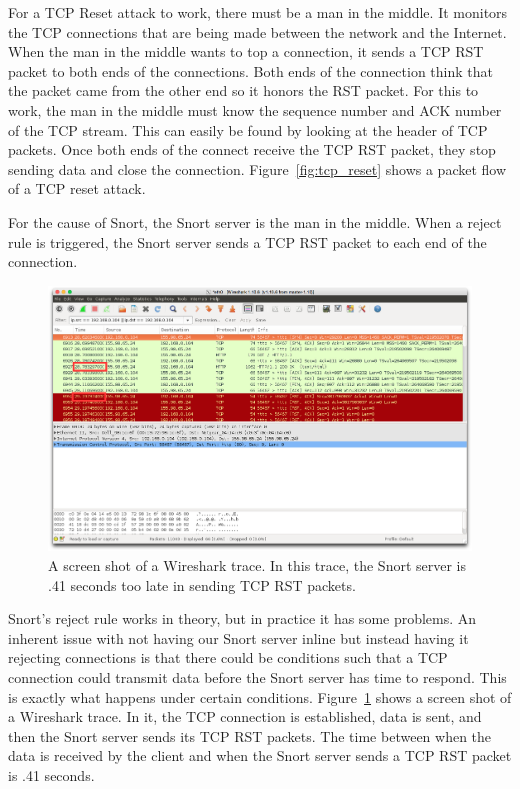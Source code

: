 For a TCP Reset attack to work, there must be a man in the middle. It monitors
the TCP connections that are being made between the network and the Internet.
When the man in the middle wants to top a connection, it sends a TCP RST packet
to both ends of the connections. Both ends of the connection think that the
packet came from the other end so it honors the RST packet. For this to work,
the man in the middle must know the sequence number and ACK number of the TCP
stream. This can easily be found by looking at the header of TCP packets. Once
both ends of the connect receive the TCP RST packet, they stop sending data and
close the connection. Figure~\ref{fig:tcp_reset} shows a packet flow of a TCP
reset attack.

For the cause of Snort, the Snort server is the man in the middle. When a
reject rule is triggered, the Snort server sends a TCP RST packet to each end
of the connection.

\begin{figure}[!t]
    \centering
    \includegraphics[width=\columnwidth]{figures/snort_slow}
    \caption{A screen shot of a Wireshark trace. In this trace, the Snort
    server is .41 seconds too late in sending TCP RST packets.}
    \label{fig:snort_slow}
\end{figure}

Snort's reject rule works in theory, but in practice it has some problems. An
inherent issue with not having our Snort server inline but instead having it
rejecting connections is that there could be conditions such that a TCP
connection could transmit data before the Snort server has time to respond.
This is exactly what happens under certain conditions.
Figure~\ref{fig:snort_slow} shows a screen shot of a Wireshark trace. In it,
the TCP connection is established, data is sent, and then the Snort server
sends its TCP RST packets. The time between when the data is received by the
client and when the Snort server sends a TCP RST packet is .41 seconds.

